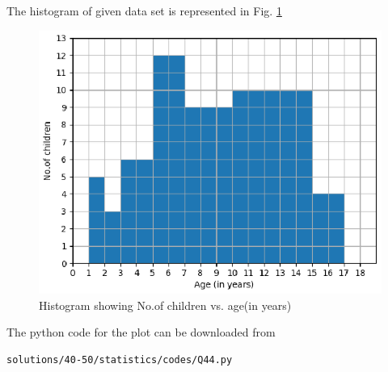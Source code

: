 The histogram of given data set is represented in Fig. \ref{fig:Q44}
\begin{figure}[!ht]
\centering
\includegraphics[width= \columnwidth]{./solutions/40-50/statistics/figs/Q44.eps}
\caption{Histogram showing No.of children vs. age(in years)}
\label{fig:Q44}
\end{figure}
The python code for the plot can be downloaded from
\begin{lstlisting}
solutions/40-50/statistics/codes/Q44.py
\end{lstlisting}

